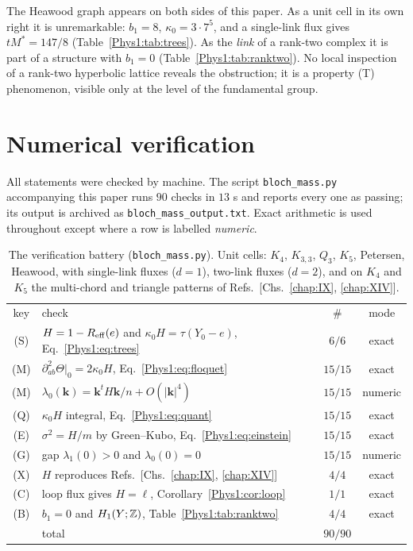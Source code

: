 \begin{remark}\label{Phys1:rem:global}
The Heawood graph appears on both sides of this paper. As a unit cell in its own right it
is unremarkable: $b_1=8$, $\kappa_0=3\cdot7^{5}$, and a single-link flux gives
$tM^{*}=147/8$ (Table~\ref{Phys1:tab:trees}). As the \emph{link} of a rank-two complex it is part
of a structure with $b_1=0$ (Table~\ref{Phys1:tab:ranktwo}). No local inspection of a rank-two
hyperbolic lattice reveals the obstruction; it is a property (T) phenomenon, visible only
at the level of the fundamental group.
\end{remark}

\section{Numerical verification}\label{Phys1:sec:battery}

All statements were checked by machine. The script \texttt{bloch\_mass.py} accompanying this
paper runs $90$ checks in $13$ s and reports every one as passing; its output is archived as
\texttt{bloch\_mass\_output.txt}. Exact arithmetic is used throughout except where a row is
labelled \emph{numeric}.

\begin{table}[t]
\centering
\begin{ruledtabular}
\begin{tabular}{clcc}
key & check & $\#$ & mode\\
\colrule
(S) & $H=1-R_{\mathrm{eff}}(e)$ and $\kappa_0H=\tau(Y_0-e)$, Eq.~\eqref{Phys1:eq:trees} & $6/6$ & exact\\
(M) & $\partial^2_{ab}\Theta|_0=2\kappa_0H$, Eq.~\eqref{Phys1:eq:floquet} & $15/15$ & exact\\
(M) & $\lambda_0(\bm k)=\bm k^{t}H\bm k/n+O(|\bm k|^{4})$ & $15/15$ & numeric\\
(Q) & $\kappa_0H$ integral, Eq.~\eqref{Phys1:eq:quant} & $15/15$ & exact\\
(E) & $\sigma^{2}=H/m$ by Green--Kubo, Eq.~\eqref{Phys1:eq:einstein} & $15/15$ & exact\\
(G) & gap $\lambda_1(0)>0$ and $\lambda_0(0)=0$ & $15/15$ & numeric\\
(X) & $H$ reproduces Refs.~[Chs.~\ref{chap:IX}, \ref{chap:XIV}] & $4/4$ & exact\\
(C) & loop flux gives $H=\ell$, Corollary~\ref{Phys1:cor:loop} & $1/1$ & exact\\
(B) & $b_1=0$ and $H_1(Y;\mathbb{Z})$, Table~\ref{Phys1:tab:ranktwo} & $4/4$ & exact\\
\colrule
 & total & $90/90$ & \\
\end{tabular}
\end{ruledtabular}
\caption{The verification battery (\texttt{bloch\_mass.py}). Unit cells: $K_4$,
$K_{3,3}$, $Q_3$, $K_5$, Petersen, Heawood, with single-link fluxes ($d=1$), two-link
fluxes ($d=2$), and on $K_4$ and $K_5$ the multi-chord and triangle patterns of
Refs.~[Chs.~\ref{chap:IX}, \ref{chap:XIV}].}
\label{Phys1:tab:battery}
\end{table}

